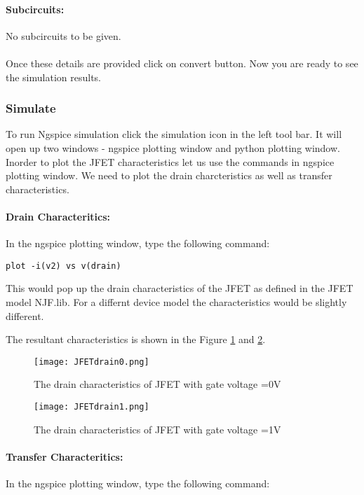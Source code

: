 \paragraph{Subcircuits:} No subcircuits to be given.

\paragraph{}
 Once these details are provided click on convert button. %
Now you are ready to see the simulation results.

\subsubsection{Simulate} To run Ngspice simulation click the simulation icon in the left tool bar. It will open up two windows - ngspice plotting window and python plotting window. Inorder to plot the JFET characteristics let us use the commands in ngspice plotting window. We need to plot the drain charcteristics as well as transfer characteristics.

\paragraph{Drain Characteritics:} In the ngspice plotting window, type the following command:

\texttt{plot -i(v2) vs v(drain)}

This would pop up the drain characteristics of the JFET as defined in the JFET model NJF.lib. For a differnt device model the characteristics would be slightly different.

The resultant characteristics is shown in the Figure \ref{JFETdrain0} and \ref{JFETdrain1}.
\begin{figure}[h]
\centering
\texttt{[image: JFETdrain0.png]}
\caption{The drain characteristics of JFET with gate voltage =0V }
\label{JFETdrain0}
\end{figure}
\begin{figure}[h]
\centering
\texttt{[image: JFETdrain1.png]}
\caption{The drain characteristics of JFET with gate voltage =1V }
\label{JFETdrain1}
\end{figure}

\paragraph{Transfer Characteritics:} In the ngspice plotting window, type the following command:

